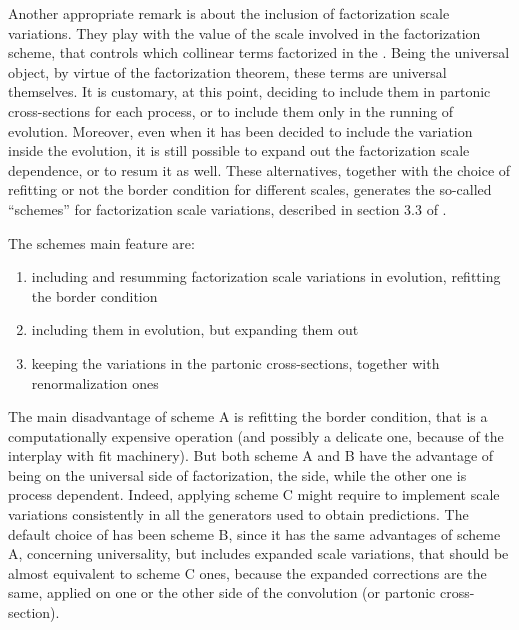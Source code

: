 Another appropriate remark is about the inclusion of factorization scale variations.
They play with the value of the scale involved in the factorization scheme,
that controls which collinear terms factorized in the \pdfs.
Being the \pdfs universal object, by virtue of the factorization theorem, these
terms are universal themselves.
%
It is customary, at this point, deciding to include them in partonic
cross-sections for each process, or to include them only in the running of
\dglap evolution.
%
Moreover, even when it has been decided to include the variation inside the
evolution, it is still possible to expand out the factorization scale
dependence, or to resum it as well.  
%
These alternatives, together with the choice of refitting or not the border
condition for different scales, generates the so-called \enquote{schemes} for
factorization scale variations, described in section 3.3 of
\cite{NNPDF:2019ubu}.

The schemes main feature are:
\begin{enumerate}[label=\Alph*.]
  \item including and resumming factorization scale variations in \dglap
    evolution, refitting the border condition
	\item including them in \dglap evolution, but expanding them out
  \item keeping the variations in the partonic cross-sections, together with
    renormalization ones
\end{enumerate}

The main disadvantage of scheme A is refitting the border condition, that is a
computationally expensive operation (and possibly a delicate one, because of
the interplay with fit machinery).
But both scheme A and B have the advantage of being on the universal side of
factorization, the \pdf side, while the other one is process dependent.
%
Indeed, applying scheme C might require to implement scale variations
consistently in all the \mc generators used to obtain predictions.
%
The default choice of \nnpdf has been scheme B, since it has the same
advantages of scheme A, concerning universality, but includes expanded scale
variations, that should be almost equivalent to scheme C ones, because the
expanded corrections are the same, applied on one or the other side of the
convolution (\pdf or partonic cross-section).
